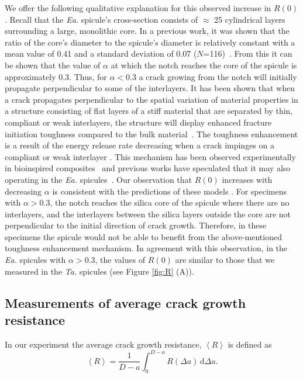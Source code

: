 \documentclass[12pt,onecolumn]{article}
\makeatletter
\newcommand{\TA}{\textit{Ta.\@}\xspace}
\newcommand{\EA}{\textit{Ea.\@}\xspace}
\makeatother
\begin{document}
\begin{bibunit}
We offer the following qualitative explanation for this observed increase in $R(0)$. Recall that the \EA spicule's cross-section consists of $\approx$ 25 cylindrical layers surrounding a large, monolithic core. In a previous work, it was shown that the ratio of the core's diameter to the spicule's diameter is relatively constant with a mean value of 0.41 and a standard deviation of 0.07 ($N$=116)~\cite{monn2015new}. From this it can be shown that the value of $\alpha$ at which the notch reaches the core of the spicule is approximately 0.3.
%
Thus, for $\alpha<$0.3 a crack growing from the notch will initially propagate perpendicular to some of the interlayers. It has been shown that when a crack propagates perpendicular to the spatial variation of material properties in a structure consisting of flat layers of a stiff material that are separated by thin, compliant or weak interlayers, the structure will display enhanced fracture initiation toughness compared to the bulk material~\cite{fratzl2007hindered, kolednik2011bioinspired, kolednik2014improvements}. The toughness enhancement is a result of the energy release rate decreasing when a crack impinges on a compliant or weak interlayer \cite{fratzl2007hindered, kolednik2011bioinspired}. This mechanism has been observed experimentally in bioinspired composites~\cite{zechner2013fracture, sistaninia2018design} and previous works have speculated that it may also operating in the \EA spicules~\cite{fratzl2007hindered, kolednik2011bioinspired}. Our observation that $R(0)$ increases with decreasing $\alpha$ is consistent with the predictions of these models \cite{fratzl2007hindered, kolednik2014improvements, kolednik2011bioinspired}.
%
For specimens with $\alpha>$0.3, the notch reaches the silica core of the spicule where there are no interlayers, and the interlayers between the silica layers outside the core are not perpendicular to the initial direction of crack growth. Therefore, in these specimens the spicule would not be able to benefit from the above-mentioned toughness enhancement mechanism. 
%
In agreement with this observation, in the \EA spicules with $\alpha>$0.3, the values of $R(0)$ are similar to those that we measured in the \TA spicules (see Figure \ref{fig:R} (A)).

\subsection*{Measurements of average crack growth resistance}
\label{sec:avgR}
In our experiment the average crack growth resistance, $\left< R \right>$ is defined as
%
\begin{equation}
    \label{eq:avgRdef}
    \left< R \right> =\frac{1}{D-a}\int_0^{D-a}R(\Delta a)\,\mathrm{d}\Delta a.
\end{equation}
%


\end{bibunit}
\end{document}
